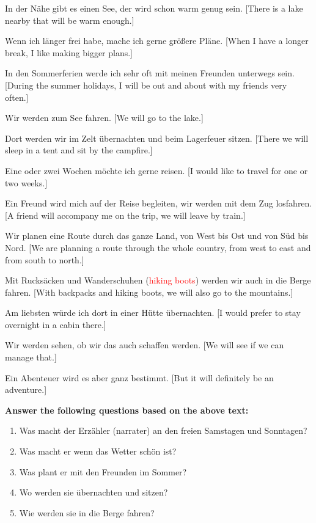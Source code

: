 \documentclass{article}
\begin{document}
\begin{enumerate}
    In der Nähe gibt es einen See, der wird schon warm genug sein. [There is a lake nearby that will be warm enough.]
    
    Wenn ich länger frei habe, mache ich gerne größere Pläne. [When I have a longer break, I like making bigger plans.]
    
    In den Sommerferien werde ich sehr oft mit meinen Freunden unterwegs sein. [During the summer holidays, I will be out and about with my friends very often.]
    
    Wir werden zum See fahren. [We will go to the lake.]
    
    Dort werden wir im Zelt übernachten und beim Lagerfeuer sitzen. [There we will sleep in a tent and sit by the campfire.]
    
    Eine oder zwei Wochen möchte ich gerne reisen. [I would like to travel for one or two weeks.]
    
    Ein Freund wird mich auf der Reise begleiten, wir werden mit dem Zug losfahren. [A friend will accompany me on the trip, we will leave by train.]
    
    Wir planen eine Route durch das ganze Land, von West bis Ost und von Süd bis Nord. [We are planning a route through the whole country, from west to east and from south to north.]
    
    Mit Rucksäcken und Wanderschuhen (\textcolor{red}{hiking boots}) werden wir auch in die Berge fahren. [With backpacks and hiking boots, we will also go to the mountains.]
    
    Am liebsten würde ich dort in einer Hütte übernachten. [I would prefer to stay overnight in a cabin there.]
    
    Wir werden sehen, ob wir das auch schaffen werden. [We will see if we can manage that.]
    
    Ein Abenteuer wird es aber ganz bestimmt. [But it will definitely be an adventure.]

    \textbf{Answer the following questions based on the above text:}
    \begin{enumerate}
        \item Was macht der Erzähler (narrater) an den freien Samstagen und Sonntagen?
        \item Was macht er wenn das Wetter schön ist?
        \item Was plant er mit den Freunden im Sommer?
        \item Wo werden sie übernachten und sitzen?
        \item Wie werden sie in die Berge fahren?
    \end{enumerate}


\end{enumerate}
\end{document}

